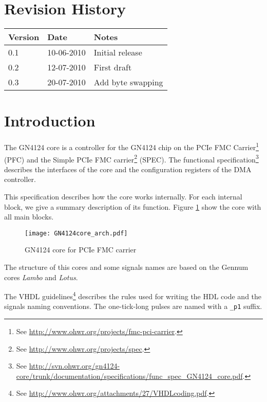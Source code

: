 \documentclass[10pt,a4paper]{cerndoc}
\begin{document}
  \cerntitle
  \section*{Revision History}
  \begin{tabularx}{\textwidth}{|p{3cm}|p{3cm}|X|}
    \hline \textbf{Version}&\textbf{Date}&\textbf{Notes}\\ \hline \hline
    0.1 & 10-06-2010 & Initial release\\ \hline
    0.2 & 12-07-2010 & First draft\\ \hline
    0.3 & 20-07-2010 & Add byte swapping\\ \hline

  \end{tabularx}

  \tableofcontents
  \listoffigures
  \clearpage

  \section*{Introduction}
The GN4124 core is a controller for the GN4124 chip on the PCIe FMC Carrier\footnote{See \href{http://www.ohwr.org/projects/fmc-pci-carrier}{http://www.ohwr.org/projects/fmc-pci-carrier}.} (PFC) and the Simple PCIe FMC carrier\footnote{See \href{http://www.ohwr.org/projects/spec}{http://www.ohwr.org/projects/spec}.} (SPEC).
The functional specification\footnote{See \href{http://svn.ohwr.org/gn4124-core/trunk/documentation/specifications/func_spec_GN4124_core.pdf}{http://svn.ohwr.org/gn4124-core/trunk/documentation/specifications/func\_spec\_GN4124\_core.pdf}.} describes the interfaces of the core and the configuration registers of the DMA controller.

This specification describes how the core works internally. For each internal block, we give a summary description of its function. Figure \ref{fig:GN4124core_arch} show the core with all main blocks.




\begin{figure}[!ht]
  \centering
    \texttt{[image: GN4124core\_arch.pdf]}
  \caption{GN4124 core for PCIe FMC carrier}
  \label{fig:GN4124core_arch}
\end{figure}

The structure of this cores and some signals names are based on the Gennum cores \emph{Lambo} and \emph{Lotus}.

The VHDL guidelines\footnote{See \href{http://www.ohwr.org/attachments/27/VHDLcoding.pdf}{http://www.ohwr.org/attachments/27/VHDLcoding.pdf}.} describes the rules used for writing the HDL code and the signals naming conventions. The one-tick-long pulses are named with a \verb+_p1+ suffix.
\end{document}
